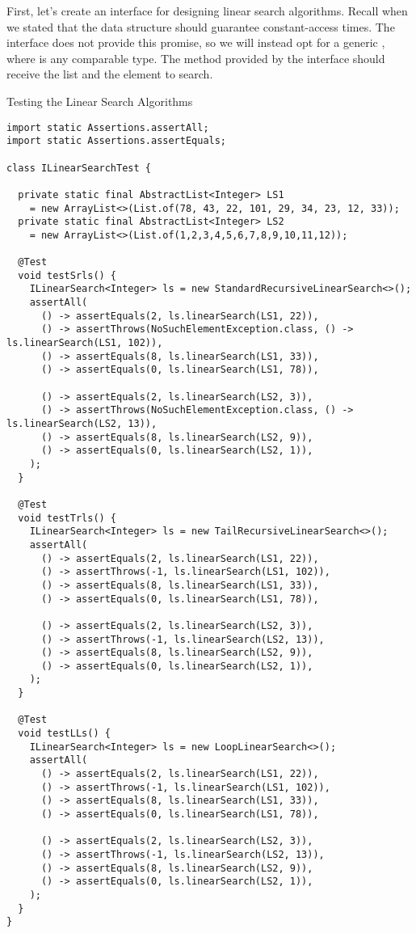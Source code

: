 First, let's create an interface for designing linear search algorithms. Recall when we stated that the data structure should guarantee constant-access times. The  interface does not provide this promise, so we will instead opt for a generic , where  is any comparable type. The method provided by the interface should receive the list and the element to search.

\begin{cl}{Testing the Linear Search Algorithms}
\begin{lstlisting}[language=MyJava]
import static Assertions.assertAll;
import static Assertions.assertEquals;

class ILinearSearchTest {

  private static final AbstractList<Integer> LS1 
    = new ArrayList<>(List.of(78, 43, 22, 101, 29, 34, 23, 12, 33));
  private static final AbstractList<Integer> LS2 
    = new ArrayList<>(List.of(1,2,3,4,5,6,7,8,9,10,11,12));

  @Test
  void testSrls() {
    ILinearSearch<Integer> ls = new StandardRecursiveLinearSearch<>();
    assertAll(
      () -> assertEquals(2, ls.linearSearch(LS1, 22)),
      () -> assertThrows(NoSuchElementException.class, () -> ls.linearSearch(LS1, 102)),
      () -> assertEquals(8, ls.linearSearch(LS1, 33)),
      () -> assertEquals(0, ls.linearSearch(LS1, 78)),

      () -> assertEquals(2, ls.linearSearch(LS2, 3)),
      () -> assertThrows(NoSuchElementException.class, () -> ls.linearSearch(LS2, 13)),
      () -> assertEquals(8, ls.linearSearch(LS2, 9)),
      () -> assertEquals(0, ls.linearSearch(LS2, 1)),
    );
  }

  @Test
  void testTrls() {
    ILinearSearch<Integer> ls = new TailRecursiveLinearSearch<>();
    assertAll(
      () -> assertEquals(2, ls.linearSearch(LS1, 22)),
      () -> assertThrows(-1, ls.linearSearch(LS1, 102)),
      () -> assertEquals(8, ls.linearSearch(LS1, 33)),
      () -> assertEquals(0, ls.linearSearch(LS1, 78)),

      () -> assertEquals(2, ls.linearSearch(LS2, 3)),
      () -> assertThrows(-1, ls.linearSearch(LS2, 13)),
      () -> assertEquals(8, ls.linearSearch(LS2, 9)),
      () -> assertEquals(0, ls.linearSearch(LS2, 1)),
    );
  }

  @Test
  void testLLs() {
    ILinearSearch<Integer> ls = new LoopLinearSearch<>();
    assertAll(
      () -> assertEquals(2, ls.linearSearch(LS1, 22)),
      () -> assertThrows(-1, ls.linearSearch(LS1, 102)),
      () -> assertEquals(8, ls.linearSearch(LS1, 33)),
      () -> assertEquals(0, ls.linearSearch(LS1, 78)),

      () -> assertEquals(2, ls.linearSearch(LS2, 3)),
      () -> assertThrows(-1, ls.linearSearch(LS2, 13)),
      () -> assertEquals(8, ls.linearSearch(LS2, 9)),
      () -> assertEquals(0, ls.linearSearch(LS2, 1)),
    );
  }
}
\end{lstlisting}
\end{cl}

